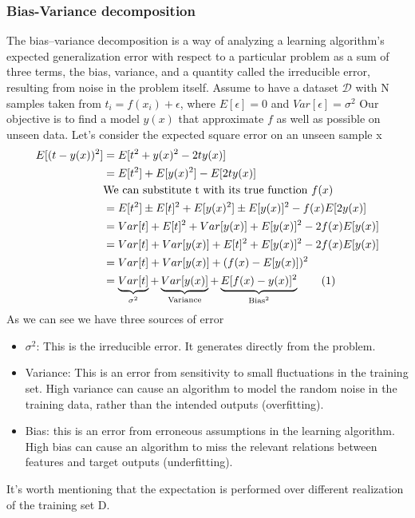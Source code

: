 \documentclass[main.tex]{subfiles}
\newcommand\numberthis{\addtocounter{equation}{1}\tag{\theequation}}
\begin{document}
\subsubsection{Bias-Variance decomposition}
The bias–variance decomposition is a way of analyzing a learning algorithm's expected generalization error with respect to a particular problem as a sum of three terms, the bias, variance, and a quantity called the irreducible error, resulting from noise in the problem itself.
Assume to have a dataset $\mathcal{D}$ with N samples taken from $t_i = f(x_i) + \epsilon$, where $E[\epsilon] = 0$ and $Var[\epsilon] = \sigma^2$
Our objective is to find a model $y(x)$ that approximate $f$ as well as possible on unseen data.
Let's consider the expected square error on an unseen sample x
\begin{align*}
    E[(t-y(x))^2] &= E[t^2 + y(x)^2 -2ty(x)] \\
    &= E[t^2] + E[y(x)^2] - E[2ty(x)] \\
    & \text{We can substitute t with its true function }f(x) \\
    &= E[t^2] \pm E[t]^2 + E[y(x)^2] \pm E[y(x)]^2 - f(x)E[2y(x)] \\
    &= Var[t] + E[t]^2 + Var[y(x)] + E[y(x)]^2 - 2f(x)E[y(x)] \\
    &= Var[t] + Var[y(x)] + E[t]^2 + E[y(x)]^2 - 2f(x)E[y(x)] \\
    &= Var[t] + Var[y(x)] + (f(x) - E[y(x)])^2 \\
    &= \underbrace{Var[t]}_{\sigma^2} + \underbrace{Var[y(x)]}_{\text{Variance}} + \underbrace{E[f(x) - y(x)]^2}_{
    \text{Bias}^2} \numberthis
\end{align*}
As we can see we have three sources of error
\begin{itemize}
    \item $\sigma^2$: This is the irreducible error. It generates directly from the problem.
    \item Variance: This is an error from sensitivity to small fluctuations in the training set. High variance can cause an algorithm to model the random noise in the training data, rather than the intended outputs (overfitting).
    \item Bias: this is an error from erroneous assumptions in the learning algorithm. High bias can cause an algorithm to miss the relevant relations between features and target outputs (underfitting).
\end{itemize}
It's worth mentioning that the expectation is performed over different realization of the training set D.
\end{document}
